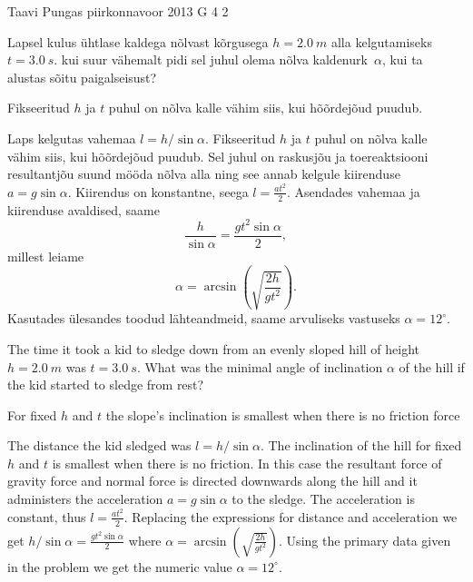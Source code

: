 {Taavi Pungas} %
{piirkonnavoor} %
{2013} %
{G 4} %
{2} %
{
\ifStatement
Lapsel kulus ühtlase kaldega nõlvast kõrgusega $h=\SI{2,0}{m}$ alla
kelgutamiseks $t=\SI{3,0}{s}$. kui suur vähemalt pidi sel juhul olema nõlva
kaldenurk~$\alpha$, kui ta alustas sõitu paigalseisust?
\fi


\ifHint
Fikseeritud $h$ ja $t$ puhul on nõlva kalle vähim siis, kui hõõrdejõud puudub.
\fi


\ifSolution
Laps kelgutas vahemaa $l=h / \sin \alpha$. Fikseeritud $h$ ja $t$ puhul on nõlva kalle vähim siis, kui hõõrdejõud puudub. Sel juhul on raskusjõu ja toereaktsiooni resultantjõu suund mööda nõlva alla ning see annab kelgule kiirenduse $a=g \sin \alpha$. Kiirendus on konstantne, seega $l=\frac{a t^2}{2}$. Asendades vahemaa ja kiirenduse avaldised, saame
\[
\frac{h}{\sin\alpha} = \frac{g t^2 \sin \alpha}{2},
\]
millest leiame
\[
\alpha = \arcsin\left( \sqrt{\frac{2h}{g t^2}}\right).
\]
Kasutades ülesandes toodud lähteandmeid, saame arvuliseks vastuseks $\alpha = 12^\circ$. 
\fi


\ifEngStatement
The time it took a kid to sledge down from an evenly sloped hill of height $h=\SI{2,0}{m}$ was $t=\SI{3,0}{s}$. What was the minimal angle of inclination $\alpha$ of the hill if the kid started to sledge from rest?
\fi


\ifEngHint
For fixed $h$ and $t$ the slope’s inclination is smallest when there is no friction force
\fi


\ifEngSolution
The distance the kid sledged was $l=h / \sin \alpha$. The inclination of the hill for fixed $h$ and $t$ is smallest when there is no friction. In this case the resultant force of gravity force and normal force is directed downwards along the hill and it administers the acceleration $a=g \sin \alpha$ to the sledge. The acceleration is constant, thus $l=\frac{a t^2}{2}$. Replacing the expressions for distance and acceleration we get $h / \sin \alpha = \frac{g t^2 \sin \alpha}{2}$ where $\alpha = \arcsin( \sqrt{\frac{2h}{g t^2}})$. Using the primary data given in the problem we get the numeric value $\alpha = 12^\circ$.
\fi
}